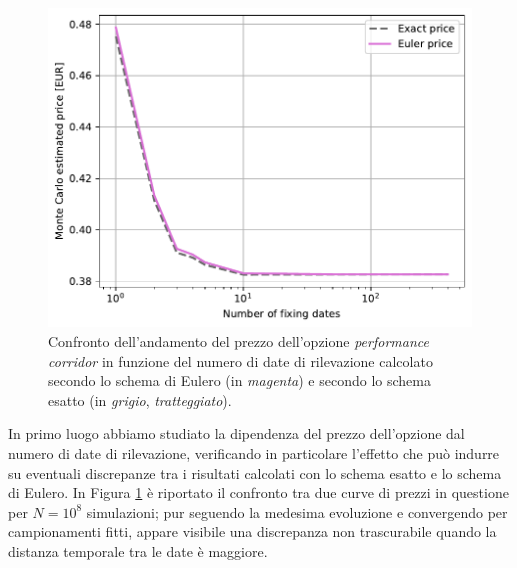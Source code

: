 \begin{figure}[t]
    \centering
    \includegraphics[scale=0.5]{graphs/OptionPriceVsM_PriceVsM_N100mln.pdf}
    \caption[Confronto dell'andamento del prezzo dell'opzione \textit{performance corridor} in funzione del numero di date di rilevazione calcolato secondo lo schema di Eulero e secondo lo schema esatto.]{Confronto dell'andamento del prezzo dell'opzione \textit{performance corridor} in funzione del numero di date di rilevazione calcolato secondo lo schema di Eulero (in \textit{magenta}) e secondo lo schema esatto (in \textit{grigio}, \textit{tratteggiato}).}
    \label{fig:exactvseuler_M}
\end{figure}

In primo luogo abbiamo studiato la dipendenza del prezzo dell'opzione dal numero di date di rilevazione, verificando in particolare l'effetto che può indurre su eventuali discrepanze tra i risultati calcolati con lo schema esatto e lo schema di Eulero. In Figura \ref{fig:exactvseuler_M} è riportato il confronto tra due curve di prezzi in questione per $N={10}^8$ simulazioni; pur seguendo la medesima evoluzione e convergendo per campionamenti fitti, appare visibile una discrepanza non trascurabile quando la distanza temporale tra le date è maggiore.

